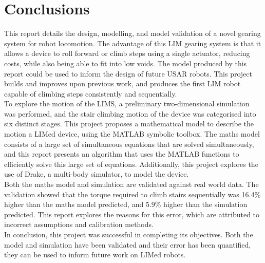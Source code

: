 \chapter{Conclusions}

This report details the design, modelling, and model validation of a novel gearing system for robot locomotion. The advantage of this LIM gearing system is that it allows a device to roll forward or climb steps using a single actuator, reducing costs, while also being able to fit into low voids. The model produced by this report could be used to inform the design of future USAR robots. This project builds and improves upon previous work, and produces the first LIM robot capable of climbing steps consistently and sequentially. \\

To explore the motion of the LIMS, a preliminary two-dimensional simulation was performed, and the stair climbing motion of the device was categorised into six distinct stages. This project proposes a mathematical model to describe the motion a LIMed device, using the MATLAB symbolic toolbox. The maths model consists of a large set of simultaneous equations that are solved simultaneously, and this report presents an algorithm that uses the MATLAB functions to efficiently solve this large set of equations. Additionally, this project explores the use of Drake, a multi-body simulator, to model the device. \\

Both the maths model and simulation are validated against real world data. The validation showed that the torque required to climb stairs sequentially was 16.4\% higher than the maths model predicted, and 5.9\% higher than the simulation predicted. This report explores the reasons for this error, which are attributed to incorrect assumptions and calibration methods.\\

In conclusion, this project was successful in completing its objectives. Both the model and simulation have been validated and their error has been quantified, they can be used to inform future work on LIMed robots.